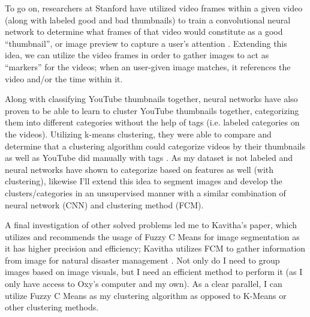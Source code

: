 \documentclass[10pt,twocolumn]{article}
\begin{document}
To go on, researchers at Stanford have utilized video frames within a given video (along with labeled good and bad thumbnails) to train a convolutional neural network to determine what frames of that video would constitute as a good “thumbnail”, or image preview to capture a user’s attention \cite{Stanford2017}. Extending this idea, we can utilize the video frames in order to gather images to act as “markers” for the videos; when an user-given image matches, it references the video and/or the time within it.

Along with classifying YouTube thumbnails together, neural networks have also proven to be able to learn to cluster YouTube thumbnails together, categorizing them into different categories without the help of tags (i.e. labeled categories on the videos). Utilizing k-means clustering, they were able to compare and determine that a clustering algorithm could categorize videos by their thumbnails as well as YouTube did manually with tags \cite{Stanford2021}. As my dataset is not labeled and neural networks have shown to categorize based on features as well (with clustering), likewise I'll extend this idea to segment images and develop the clusters/categories in an unsupervised manner with a similar combination of neural network (CNN) and clustering method (FCM).

A final investigation of other solved problems led me to Kavitha's paper, which utilizes and recommends the usage of Fuzzy C Means for image segmentation as it has higher precision and efficiency; Kavitha utilizes FCM to gather information from image for natural disaster management \cite{Kavitha2020}. Not only do I need to group images based on image visuals, but I need an efficient method to perform it (as I only have access to Oxy's computer and my own). As a clear parallel, I can utilize Fuzzy C Means as my clustering algorithm as opposed to K-Means or other clustering methods.

\end{document}
